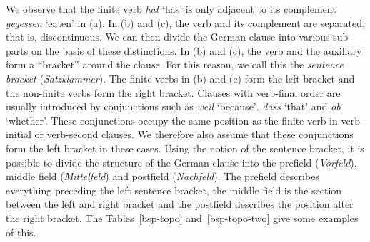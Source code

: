 We observe that the finite verb \emph{hat} `has' is only adjacent to its complement
\emph{gegessen} `eaten' in (a). In (b) and (c), the verb and its complement
are separated, that is, discontinuous. We can then divide the German clause into various sub-parts on the basis of these distinctions.
In (b) and (c), the verb and the auxiliary form a ``bracket'' around the clause. For this reason, we call this the \emph{sentence bracket} (\emph{Satzklammer}).
The finite verbs in (b) and (c) form the left bracket and the non-finite verbs form the right bracket. Clauses with verb-final order are usually introduced by conjunctions such as 
\emph{weil} `because', \emph{dass} `that' and \emph{ob} `whether'. These conjunctions occupy the same position as the finite verb in verb-initial or verb-second clauses. We therefore
also assume that these conjunctions form the left bracket in these cases. Using the notion of the sentence bracket, it is possible to divide the structure of the German clause into the 
prefield (\emph{Vorfeld}), middle field (\emph{Mittelfeld}) and postfield (\emph{Nachfeld}). The
prefield describes everything preceding the left sentence bracket, the middle field is the section
between the left and right bracket and the postfield describes the position after the right bracket.
The Tables~\ref{bsp-topo} and~\ref{bsp-topo-two} give some examples of this.
%
{}%
%
%
%
%
%
